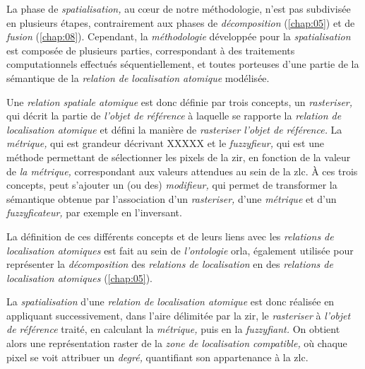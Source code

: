 La phase de \emph{spatialisation,} au cœur de notre méthodologie,
n'est pas subdivisée en plusieurs étapes, contrairement aux phases de
\emph{décomposition} (\autoref{chap:05}) et de \emph{fusion}
(\autoref{chap:08}). Cependant, la \emph{méthodologie} développée pour
la \emph{spatialisation} est composée de plusieurs parties,
correspondant à des traitements computationnels effectués
séquentiellement, et toutes porteuses d'une partie de la sémantique de
la \emph{relation de localisation atomique} modélisée.

Une \emph{relation spatiale atomique} est donc définie par trois
concepts, un \emph{rasteriser,} qui décrit la partie de \emph{l'objet
  de référence} à laquelle se rapporte la \emph{relation de
  localisation atomique} et défini la manière de \emph{rasteriser}
\emph{l'objet de référence.} La \emph{métrique,} qui est grandeur
décrivant XXXXX et le \emph{fuzzyfieur,} qui est une méthode
permettant de sélectionner les pixels de la \ac{zir}, en fonction de
la valeur de \emph{la métrique,} correspondant aux valeurs attendues
au sein de la \ac{zlc}. À ces trois concepts, peut s'ajouter un (ou
des) \emph{modifieur,} qui permet de transformer la sémantique obtenue
par l'association d'un \emph{rasteriser,} d'une \emph{métrique} et
d'un \emph{fuzzyficateur,} par exemple en l'inversant.

La définition de ces différents concepts et de leurs liens avec les
\emph{relations de localisation atomiques} est fait au sein de
\emph{l'ontologie} \ac{orla}, également utilisée pour représenter la
\emph{décomposition} des \emph{relations de localisation} en des
\emph{relations de localisation atomiques} (\autoref{chap:05}).

La \emph{spatialisation} d'une \emph{relation de localisation
  atomique} est donc réalisée en appliquant successivement, dans
l'aire délimitée par la \ac{zir}, le \emph{rasteriser} à \emph{l'objet
  de référence} traité, en calculant la \emph{métrique,} puis en la
\emph{fuzzyfiant.} On obtient alors une représentation raster de la
\emph{zone de localisation compatible,} où chaque pixel se voit
attribuer un \emph{degré,} quantifiant son appartenance à la \ac{zlc}.


